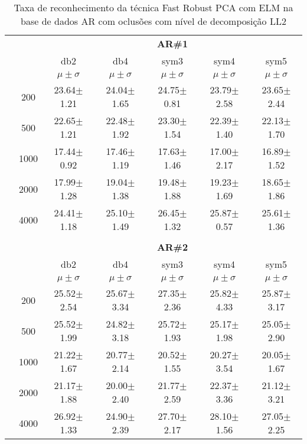 \begin{table}[H]
	\centering
    \normalsize
	\caption{Taxa de reconhecimento da técnica Fast Robust PCA com ELM na base de dados AR com oclusões com nível de decomposição LL2}
	\begin{tabular}{|c|c|c c c c c|}
\cline{3-7}
\multicolumn{2}{c|}{\multirow{3}{*}{}} & \multicolumn{5}{c|}{\textbf{AR\#1}}   \\\cline{3-7} 
\multicolumn{2}{c|}{}  & db2 & db4 & sym3 & sym4 & sym5 \\\cline{3-7}%
\multicolumn{2}{c|}{}& $\mu \pm \sigma$ & $\mu \pm \sigma$ & $\mu \pm \sigma$ & $\mu \pm \sigma$ & $\mu \pm \sigma$ \\\hline


\multicolumn{1}{|c|}{ \multirow{5}{*}{\rotatebox[origin=c]{90}{\textbf{Neurônios}}} }
&200	&23.64$\pm$1.21	&24.04$\pm$1.65	&24.75$\pm$0.81	&23.79$\pm$2.58	&23.65$\pm$2.44\\\cline{2-7}
&500	&22.65$\pm$1.21	&22.48$\pm$1.92	&23.30$\pm$1.54	&22.39$\pm$1.40	&22.13$\pm$1.70\\\cline{2-7}
&1000	&17.44$\pm$0.92	&17.46$\pm$1.19	&17.63$\pm$1.46	&17.00$\pm$2.17 &16.89$\pm$1.52\\\cline{2-7}
&2000	&17.99$\pm$1.28	&19.04$\pm$1.38	&19.48$\pm$1.88	&19.23$\pm$1.69	&18.65$\pm$1.86\\\cline{2-7}
&4000	&24.41$\pm$1.18	&25.10$\pm$1.49	&26.45$\pm$1.32	&25.87$\pm$0.57	&25.61$\pm$1.36





\\\midrule%

\multicolumn{7}{c}{}\\ 

\cline{3-7}
\multicolumn{2}{c|}{\multirow{3}{*}{}} & \multicolumn{5}{c|}{\textbf{AR\#2}}   \\\cline{3-7} 

\multicolumn{2}{c|}{}  & db2 & db4 & sym3 & sym4 & sym5 \\\cline{3-7}
\multicolumn{2}{c|}{}& $\mu \pm \sigma$ & $\mu \pm \sigma$ & $\mu \pm \sigma$ & $\mu \pm \sigma$ & $\mu \pm \sigma$ \\\hline


\multicolumn{1}{|c|}{ \multirow{5}{*}{\rotatebox[origin=c]{90}{\textbf{Neurônios}}} }
&200	&25.52$\pm$2.54	&25.67$\pm$3.34	&27.35$\pm$2.36	&25.82$\pm$4.33	&25.87$\pm$3.17\\\cline{2-7}
&500	&25.52$\pm$1.99	&24.82$\pm$3.18	&25.72$\pm$1.93	&25.17$\pm$1.98	&25.05$\pm$2.90\\\cline{2-7}
&1000	&21.22$\pm$1.67	&20.77$\pm$2.14	&20.52$\pm$1.55	&20.27$\pm$3.54	&20.05$\pm$1.67\\\cline{2-7}
&2000	&21.17$\pm$1.88	&20.00$\pm$2.40	&21.77$\pm$2.59	&22.37$\pm$3.36	&21.12$\pm$3.21\\\cline{2-7}
&4000	&26.92$\pm$1.33	&24.90$\pm$2.39	&27.70$\pm$2.17	&28.10$\pm$1.56	&27.05$\pm$2.25



\end{tabular}
\end{table}
